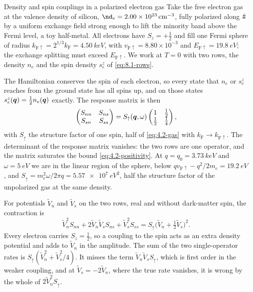\begin{workedexample}{Density and spin couplings in a polarized electron gas}\label{we:8-cross}
Take the free electron gas at the valence density of silicon, $\nd_e = \SI{2.00e23}{cm^{-3}}$, fully polarized along $\hat{\bm{z}}$ by a uniform exchange field strong enough to lift the minority band above the Fermi level, a toy half-metal. All electrons have $S_z = +\frac12$ and fill one Fermi sphere of radius $k_{\mathrm{F}\uparrow} = 2^{1/3}k_{\mathrm{F}} = \SI{4.50}{keV}$, with $v_{\mathrm{F}\uparrow} = 8.80\times10^{-3}$ and $E_{\mathrm{F}\uparrow} = \SI{19.8}{eV}$; the exchange splitting must exceed $E_{\mathrm{F}\uparrow}$. We work at $T = 0$ with two rows, the density $n_e$ and the spin density $s^z_e$ of \cref{eq:8.1-rows}.

The Hamiltonian conserves the spin of each electron, so every state that $n_e$ or $s^z_e$ reaches from the ground state has all spins up, and on those states $s^z_e(\bm{q}) = \frac12 n_e(\bm{q})$ exactly. The response matrix is then
\begin{equation*}
  \begin{pmatrix} S_{nn} & S_{ns} \\ S_{sn} & S_{ss} \end{pmatrix} = S_\uparrow(\bm{q},\omega)\begin{pmatrix} 1 & \frac12 \\ \frac12 & \frac14 \end{pmatrix} ,
\end{equation*}
with $S_\uparrow$ the structure factor of one spin, half of \cref{eq:4.2-gas} with $k_{\mathrm{F}} \to k_{\mathrm{F}\uparrow}$. The determinant of the response matrix vanishes: the two rows are one operator, and the matrix saturates the bound \cref{eq:4.2-positivity}. At $q = q_0 = \SI{3.73}{keV}$ and $\omega = \SI{5}{eV}$ we are in the linear region of the sphere, below $qv_{\mathrm{F}\uparrow} - q^2/2m_e = \SI{19.2}{eV}$, and $S_\uparrow = m_e^2\omega/2\pi q = \SI{5.57e7}{eV^2}$, half the structure factor of the unpolarized gas at the same density.

For potentials $\tilde V_n$ and $\tilde V_s$ on the two rows, real and without dark-matter spin, the contraction is
\begin{equation*}
  \tilde V_n^2S_{nn} + 2\tilde V_n\tilde V_sS_{ns} + \tilde V_s^2S_{ss} = S_\uparrow\bigl(\tilde V_n + \tfrac12\tilde V_s\bigr)^2 .
\end{equation*}
Every electron carries $S_z = \frac12$, so a coupling to the spin acts as an extra density potential and adds to $\tilde V_n$ in the amplitude. The sum of the two single-operator rates is $S_\uparrow(\tilde V_n^2 + \tilde V_s^2/4)$. It misses the term $\tilde V_n\tilde V_sS_\uparrow$, which is first order in the weaker coupling, and at $\tilde V_s = -2\tilde V_n$, where the true rate vanishes, it is wrong by the whole of $2\tilde V_n^2S_\uparrow$.


\end{workedexample}
